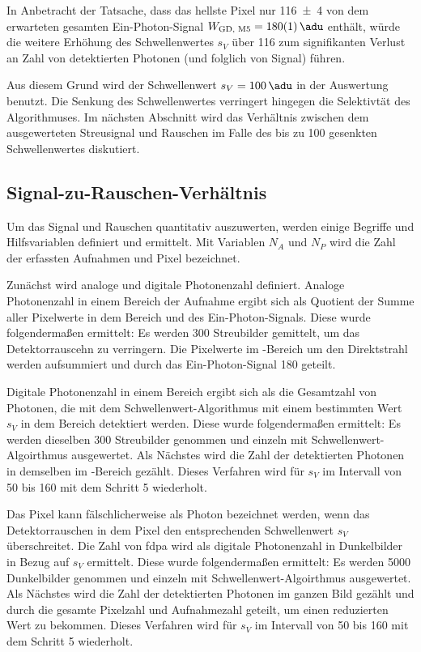 \noindent
In Anbetracht der Tatsache, dass das hellste Pixel nur \SI{116(4)}{\adu} von dem erwarteten gesamten Ein-Photon-Signal $W_\text{GD, M5} = \SI{180(1)}{\adu}$ enthält, würde die weitere Erhöhung des Schwellenwertes $s_V$ über \SI{116}{\adu} zum signifikanten Verlust an Zahl von detektierten Photonen (und folglich von Signal) führen.

\noindent
Aus diesem Grund wird der Schwellenwert $s_V = \SI{100}{\adu}$ in der Auswertung benutzt. Die Senkung des Schwellenwertes verringert hingegen die Selektivtät des Algorithmuses. Im nächsten Abschnitt wird das Verhältnis zwischen dem ausgewerteten Streusignal und Rauschen im Falle des bis zu \SI{100}{\adu} gesenkten Schwellenwertes diskutiert.

\subsection{Signal-zu-Rauschen-Verhältnis}
Um das Signal und Rauschen quantitativ auszuwerten, werden einige Begriffe und Hilfsvariablen definiert und ermittelt. Mit Variablen $N_A$ und $N_P$ wird die Zahl der erfassten Aufnahmen und Pixel bezeichnet.

\noindent
Zunächst wird analoge und digitale Photonenzahl definiert. Analoge Photonenzahl in einem Bereich der Aufnahme ergibt sich als Quotient der Summe aller Pixelwerte in dem Bereich und des Ein-Photon-Signals. Diese wurde folgendermaßen ermittelt: Es werden 300 Streubilder gemittelt, um das Detektorrauscehn zu verringern. Die Pixelwerte im -Bereich um den Direktstrahl werden aufsummiert und durch das Ein-Photon-Signal \SI{180}{\adu} geteilt.

\noindent
Digitale Photonenzahl in einem Bereich ergibt sich als die Gesamtzahl von Photonen, die mit dem Schwellenwert-Algorithmus mit einem bestimmten Wert $s_V$ in dem Bereich detektiert werden. Diese wurde folgendermaßen ermittelt: Es werden dieselben 300 Streubilder genommen und einzeln mit Schwellenwert-Algoirthmus ausgewertet. Als Nächstes wird die Zahl der detektierten Photonen in demselben im -Bereich gezählt. Dieses Verfahren wird für $s_V$ im Intervall von \SI{50}{\adu} bis \SI{160}{\adu} mit dem Schritt \SI{5}{\adu} wiederholt.

\noindent
Das Pixel kann fälschlicherweise als Photon bezeichnet werden, wenn das Detektorrauschen in dem Pixel den entsprechenden Schwellenwert $s_V$ überschreitet. Die Zahl von \gls{fdpa} wird als digitale Photonenzahl in Dunkelbilder in Bezug auf $s_V$ ermittelt. Diese wurde folgendermaßen ermittelt: Es werden 5000 Dunkelbilder genommen und einzeln mit Schwellenwert-Algoirthmus ausgewertet. Als Nächstes wird die Zahl der detektierten Photonen im ganzen Bild gezählt und durch die gesamte Pixelzahl  und Aufnahmezahl geteilt, um einen reduzierten Wert zu bekommen. Dieses Verfahren wird für $s_V$ im Intervall von \SI{50}{\adu} bis \SI{160}{\adu} mit dem Schritt \SI{5}{\adu} wiederholt.

